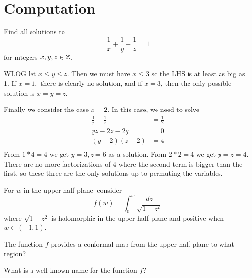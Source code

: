 \documentclass{homework}
\begin{document}
                \section{Computation}

                \begin{problem}
                  Find all solutions to
                    \[
                        \frac{1}{x} + \frac{1}{y} + \frac{1}{z} = 1
                          \]
                            for integers $x,y,z \in \mathbb{Z}$.
                            \end{problem}
                            \begin{solution}
                            WLOG let $x\leq y\leq z$. Then we must have $x\leq 3$ so the LHS is at least as big as 1. If $x=1,$ there is clearly no solution, and if $x=3$, then the only possible solution is $x=y=z.$

                            Finally we consider the case $x=2.$ In this case, we need to solve
                            \begin{align*}
                            \frac{1}{y} + \frac{1}{z} &= \frac{1}{2}\\
                            yz - 2z - 2y &= 0\\
                            (y - 2)(z - 2) &= 4\\
                            \end{align*}
                            From $1*4 = 4$ we get $y=3, z=6$ as a solution. From $2*2=4$ we get $y=z=4.$ There are no more factorizations of $4$ where the second term is bigger than the first, so these three are the only solutions up to permuting the variables.
                            \end{solution}
                            \begin{problem}
                              For $w$ in the upper half-plane, consider
                                \[
                                    f(w) = \int_0^w  \frac{dz}{\sqrt{1-z^2}}
                                      \]
                                        where $\sqrt{1-z^2}$ is holomorphic in the upper half-plane and positive when $w \in (-1,1)$.

                                          The function $f$ provides a conformal map from the upper half-plane to what region?

                                            What is a well-known name for the function $f$?
                                            \end{problem}
\end{document}
